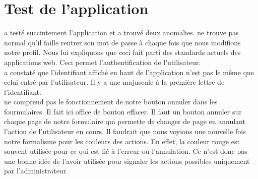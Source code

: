 \documentclass [a4paper] {article}
\begin{document}
\section{Test de l'application}
\nomTuteurPedago{} a testé succintement l'application et a trouvé deux anomalies. \nomTuteurPedago{} ne trouve pas normal qu'il faille rentrer son mot de passe à chaque fois que nous modifions notre profil. Nous lui expliquons que ceci fait parti des standards actuels des applications web. Ceci permet l'authentification de l'utilisateur.\\
\nomTuteurPedago{} a constaté que l'identifiant affiché en haut de l'application n'est pas le même que celui entré par l'utilisateur. Il y a une majuscule à la première lettre de l'identifiant.\\
\nomTuteurPedago{} ne comprend pas le fonctionnement de notre bouton annuler dans les fourmulaires. Il fait ici office de bouton effacer.
Il faut un bouton annuler sur chaque page de notre formulaire qui permette de changer de page en annulant l'action de l'utilisateur en cours.
Il faudrait que nous voyions une nouvelle fois notre formalisme pour les couleurs des actions. En effet, la couleur rouge est souvent utilisée pour ce qui est lié à l'erreur ou l'annulation. Ce n'est donc pas une bonne idée de l'avoir utilisée pour signaler les actions possibles uniquement par l'administrateur.
\newpage
\end{document}
